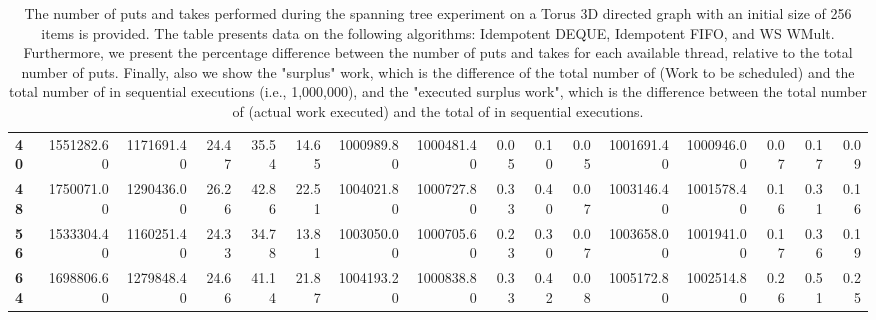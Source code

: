 \begin{table}[!ht]
{\begin{tabular}{lrrrrrrrrrrrrrrr}
\textbf{40} &       1551282.60 & 1171691.40 &          24.47 &       35.54 &                14.65 &      1000989.80 & 1000481.40 &           0.05 &        0.10 &                 0.05 & 1001691.40 & 1000946.00 &           0.07 &        0.17 &                 0.09 \\
\textbf{48} &       1750071.00 & 1290436.00 &          26.26 &       42.86 &                22.51 &      1004021.80 & 1000727.80 &           0.33 &        0.40 &                 0.07 & 1003146.40 & 1001578.40 &           0.16 &        0.31 &                 0.16 \\
\textbf{56} &       1533304.40 & 1160251.40 &          24.33 &       34.78 &                13.81 &      1003050.00 & 1000705.60 &           0.23 &        0.30 &                 0.07 & 1003658.00 & 1001941.00 &           0.17 &        0.36 &                 0.19 \\
\textbf{64} &       1698806.60 & 1279848.40 &          24.66 &       41.14 &                21.87 &      1004193.20 & 1000838.80 &           0.33 &        0.42 &                 0.08 & 1005172.80 & 1002514.80 &           0.26 &        0.51 &                 0.25 \\
\bottomrule
\end{tabular}}
\label{difference-Torus_3D_directed-256-IDEMPOTENT_DEQUE-IDEMPOTENT_FIFO-WS_NC_MULT_OPT}
\caption{The number of puts and takes performed during the
    spanning tree experiment on a Torus 3D directed graph with an initial size
    of 256 items is provided. The table presents data on the
    following algorithms: Idempotent DEQUE, Idempotent FIFO, and
    WS WMult. Furthermore, we present the percentage difference
    between the number of puts and takes for each available thread,
    relative to the total number of puts. Finally, also we show the
    "surplus" work, which is the difference of the total number of
    \Puts (Work to be scheduled) and the total number of \Puts in
    sequential executions (i.e., 1,000,000), and the "executed surplus
    work", which is the difference between the total number of \Takes
    (actual work executed) and the total of \Takes in sequential
    executions.}
\end{table}
